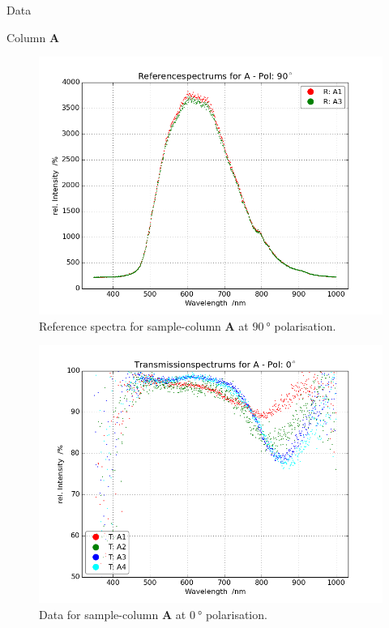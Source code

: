\begin{appendix}
\begin{chapter}{Data}
\begin{section}{Column \textbf{A}}
\begin{figure}[ht!]
\begin{minipage}{.92\textwidth}
          \includegraphics[width=\textwidth]{Figures/Refspec_APol90.png}
          \caption{Reference spectra for sample-column \textbf{A} at
              $\SI{90}{\degree}$ polarisation.}
          \label{fig:Refspec_APol90}
        \end{minipage}
      \end{figure}
      \newpage
      \begin{figure}[ht!]
        \centering
        \begin{minipage}{.92\textwidth}
          \centering
          \includegraphics[width=\textwidth]{Figures/TransspecRAW_APol0.png}
          \caption{Data for sample-column \textbf{A} at $\SI{0}{\degree}$
              polarisation.}
          \label{fig:TransspecRAW_APol0}

\end{minipage}
\end{figure}
\end{section}
\end{chapter}
\end{appendix}

